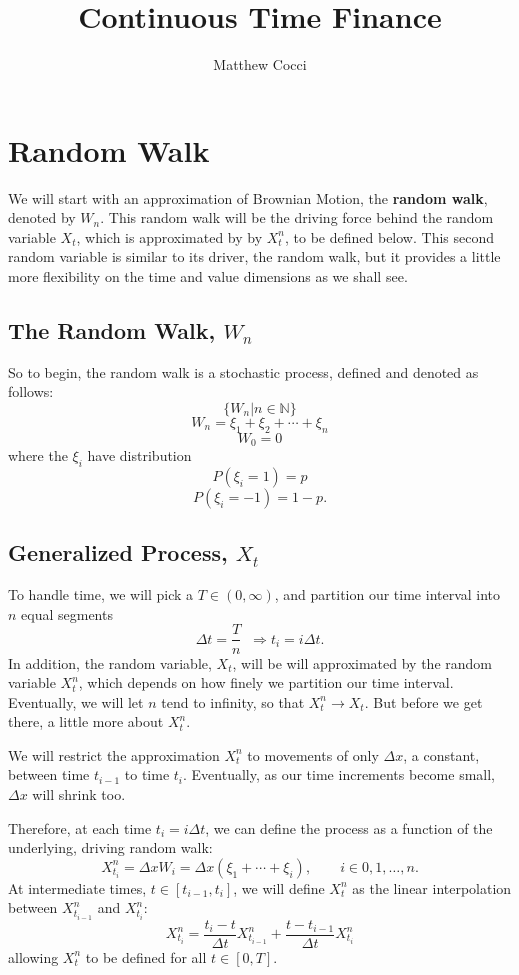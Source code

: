 \documentclass[a4paper,12pt]{scrartcl}
\title{Continuous Time Finance}
\author{Matthew Cocci}
\begin{document}
\maketitle

\section{Random Walk}

We will start with an approximation of Brownian Motion, the 
\textbf{random walk}, denoted by $W_n$.  This random walk will be the
driving force behind the random variable $X_t$, which is approximated by
by $X^n_t$, to be defined below.  This second random variable is 
similar to its driver, the random walk, but it provides a little more
flexibility on the time and value dimensions as we shall see.

\subsection{The Random Walk, $W_n$}
So to begin, the random walk is a stochastic process, defined and denoted
as follows:
   \[ \{ W_n | n \in \mathbb{N} \} \]
   \[ W_n = \xi_1 + \xi_2 + \cdots + \xi_n \]
   \[ W_0 =  0 \]
where the $\xi_i$ have distribution
   \[ P(\xi_i = 1) = p \]
   \[ P(\xi_i = -1) = 1-p. \]  

\subsection{Generalized Process, $X_t$}
To handle time, we will pick a $T \in (0, \infty)$, and partition our 
time interval into $n$ equal segments
   \[ \Delta t = \frac{T}{n} \;\; \Rightarrow t_i = i \Delta t.\]
In addition, the random variable, $X_t$, will be will approximated by
the random variable $X^n_t$, which depends on how finely we partition 
our time interval.  Eventually, we will let $n$ tend to infinity, so 
that $X^n_t \rightarrow X_t$. But before we get there, a little more 
about $X^n_t$. 

We will restrict the approximation $X^n_t$ to movements of 
only $\Delta x$, a constant, between time $t_{i-1}$ to time $t_i$. 
Eventually, as our time increments become small, $\Delta x$ will 
shrink too.

Therefore, at each time $t_i =  i \Delta  t $, we can define the process
as a function of the underlying, driving random walk:
\begin{equation}
   \label{bm1}
   X^n_{t_i} = \Delta x W_i = \Delta x (\xi_1 + \cdots + \xi_i),
      \qquad i \in 0,1,\ldots,n.
\end{equation}
At intermediate times, $t \in [t_{i-1},t_i]$, we will define $X^n_t$ as
the linear interpolation between $X^n_{t_{i-1}}$ and  $X^n_{t_{i}}$:
\[ X^n_{t_{i}} = \frac{t_i - t}{\Delta t} X^n_{t_{i-1}} + 
   \frac{t- t_{i -1}} {\Delta t} X^n_{t_{i}} \] 
allowing $X_t^n$ to be defined for all $t \in [0,T]$.
\end{document}

